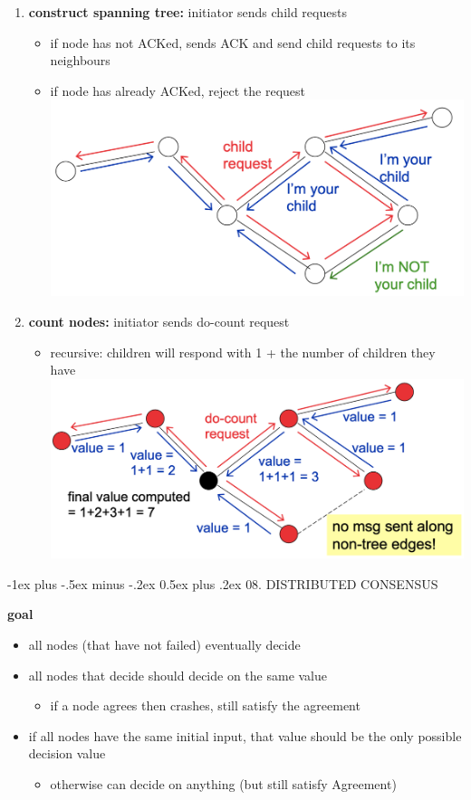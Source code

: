 \documentclass[10pt, landscape]{article}
\makeatletter
\renewcommand{\section}{\@startsection{section}{1}{0mm}%
  {-1ex plus -.5ex minus -.2ex}%
  {0.5ex plus .2ex}%
{\normalfont\large\bfseries}}
\makeatother
\begin{document}
\begin{multicols*}{3}
  \begin{enumerate}
    \item \textbf{construct spanning tree:} initiator sends child requests
      \begin{itemize}
        \item if node has not ACKed, sends ACK and send child requests to its neighbours
        \item if node has already ACKed, reject the request
          \includegraphics[width=0.5\linewidth]{cs4231-spanningtree-1.png} 
      \end{itemize}
    \item \textbf{count nodes:} initiator sends do-count request
      \begin{itemize}
        \item recursive: children will respond with 1 + the number of children they have
          \includegraphics[width=0.6\linewidth]{cs4231-spanningtree-2.png} 
      \end{itemize}
  \end{enumerate}

  \vfill\null
  \columnbreak

  \section{08. DISTRIBUTED CONSENSUS}

  \textbf{goal}

  \begin{itemize}
    \item {} all nodes (that have not failed) eventually decide
    \item {} all nodes that decide should decide on the same value
      \begin{itemize}
        \item if a node agrees then crashes, still satisfy the agreement
      \end{itemize}
    \item {} if all nodes have the same initial input, that value should be the only possible decision value
      \begin{itemize}
        \item otherwise can decide on anything (but still satisfy Agreement)
      \end{itemize}
  \end{itemize}


\end{multicols*}
\end{document}
